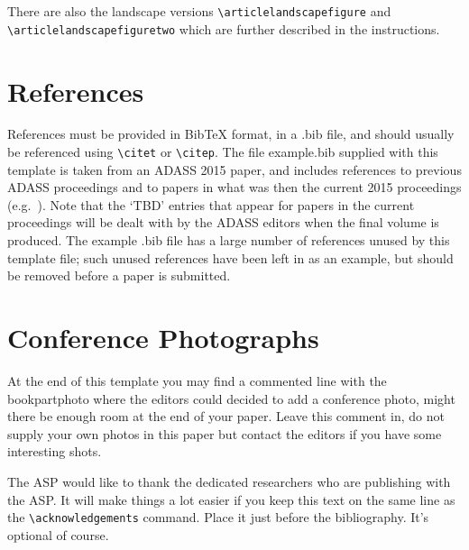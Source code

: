 \documentclass[11pt,twoside]{article}
\begin{document}

\clearpage %

There are also the landscape versions \verb"\articlelandscapefigure" and \\
\verb"\articlelandscapefiguretwo" which are further described in the instructions.

\section{References}
References must be provided in BibTeX format, in a .bib file, and should usually be referenced using \verb"\citet" or \verb"\citep". The file example.bib supplied with this template is taken from an ADASS 2015 paper, and includes references to previous ADASS proceedings 
\citep[such as][]{1999ASPC..172..487P} and to papers in what was then the current 2015 proceedings (e.g.\ \citet{O11-4_adassxxv}). Note that the `TBD' entries that appear for papers in the current proceedings will be dealt with by the ADASS editors when the final volume is produced. The example .bib file has a large number of references unused by this template file; such unused references have been left in as an example, but should be removed before a paper is submitted.

\section{Conference Photographs}

At the end of this template you may find a commented line with the bookpartphoto where the editors could decided to add a conference photo,
might there be enough room at the end of your paper. Leave this comment in, do not supply your own photos in this paper but contact the editors
if you have some interesting shots.

\acknowledgements The ASP would like to thank the dedicated researchers who are publishing with the ASP.  It will make things a lot easier if you keep this text on the same line as the \verb"\acknowledgements" command. Place it just before the bibliography. It's optional of course.



\end{document}
